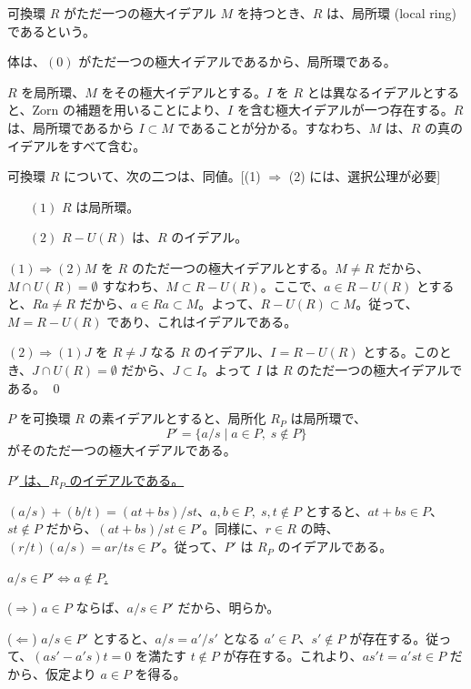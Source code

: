 \begin{definition}
可換環 $R$ がただ一つの極大イデアル $M$ を持つとき、$R$ は、局所環 (local ring) であるという。
\end{definition}

\note
体は、$(0)$ がただ一つの極大イデアルであるから、局所環である。

$R$ を局所環、$M$ をその極大イデアルとする。$I$ を $R$ とは異なるイデアルとすると、Zorn の補題を用いることにより、$I$ を含む極大イデアルが一つ存在する。$R$ は、局所環であるから $I\subset M$ であることが分かる。すなわち、$M$ は、$R$ の真のイデアルをすべて含む。

\begin{prop} \label{prop:local_ring}
可換環 $R$ について、次の二つは、同値。{\rm [(1) $\Rightarrow$ (2) には、選択公理が必要]}
\begin{itemize}
\item[$(1)$] $R$ は局所環。
\item[$(2)$] $R-U(R)$ は、$R$ のイデアル。
\end{itemize}
\end{prop}
\proof
$(1)\Rightarrow (2)$\quad $M$ を $R$ のただ一つの極大イデアルとする。$M\neq R$ だから、$M\cap U(R) = \emptyset$ すなわち、$M\subset R - U(R)$。ここで、$a\in R- U(R)$ とすると、$Ra \neq R$ だから、$a\in Ra \subset M$。よって、$R - U(R)\subset M$。従って、$M = R - U(R)$ であり、これはイデアルである。

$(2)\Rightarrow (1)$\quad $J$ を $R\neq J$ なる $R$ のイデアル、$I = R - U(R)$ とする。このとき、$J\cap U(R) = \emptyset$  だから、$J\subset I$。よって $I$ は $R$ のただ一つの極大イデアルである。
\qed

\begin{prop}
$P$  を可換環 $R$ の素イデアルとすると、局所化 $R_P$ は局所環で、
$$P' = \{a/s\mid a\in P,\;s\not\in P\}$$
がそのただ一つの極大イデアルである。
\end{prop}
\proof
\underline{$P'$ は、$R_P$ のイデアルである。}

\pf
$(a/s)+(b/t) = (at+bs)/st$、$a,b\in P,\;s,t\not\in P$ とすると、$at+bs\in P$、$st\not\in P$ だから、$(at+bs)/st\in P'$。同様に、$r\in R$ の時、$(r/t)(a/s) = ar/ts\in P'$。従って、$P'$ は $R_P$ のイデアルである。

\smallskip
\underline{$a/s\in P'\Leftrightarrow a\not\in P$.}

\pf
($\Rightarrow$) $a\in P$ ならば、$a/s\in P'$ だから、明らか。

($\Leftarrow$) $a/s\in P'$ とすると、$a/s = a'/s'$ となる $a'\in P$、$s'\not\in P$ が存在する。従って、$(as' - a's)t = 0$ を満たす $t\not\in P$ が存在する。これより、$as't = a'st\in P$ だから、仮定より $a\in P$ を得る。

